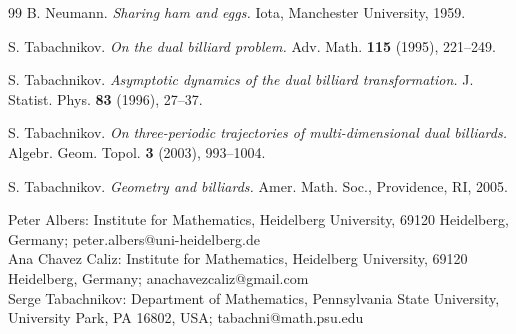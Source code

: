 \documentclass[12pt]{article}
\begin{document}
\begin{thebibliography}{99}
 B. Neumann. {\it Sharing ham and eggs.} Iota, Manchester University,
1959.

 S. Tabachnikov. {\it On the dual billiard problem.} Adv. Math. {\bf 115} (1995),  221--249. 

 S. Tabachnikov. {\it Asymptotic dynamics of the dual billiard transformation.} J. Statist. Phys. {\bf 83} (1996),  27--37. 

 S. Tabachnikov. {\it  On three-periodic trajectories of multi-dimensional dual billiards.} Algebr. Geom. Topol. {\bf 3} (2003), 993--1004.

 S. Tabachnikov. {\it Geometry and billiards.} Amer. Math. Soc., Providence, RI, 2005.


\end{thebibliography}
%
\hrulefill

\bigskip
\noindent Peter Albers: 
Institute for Mathematics,
Heidelberg University,
69120 Heidelberg,
Germany;
peter.albers@uni-heidelberg.de\\

\noindent Ana Chavez Caliz:
Institute for Mathematics,
Heidelberg University,
69120 Heidelberg,
Germany;
anachavezcaliz@gmail.com\\

\noindent Serge Tabachnikov:
Department of Mathematics,
Pennsylvania State University,
University Park, PA 16802,
USA;
tabachni@math.psu.edu
\end{document}
